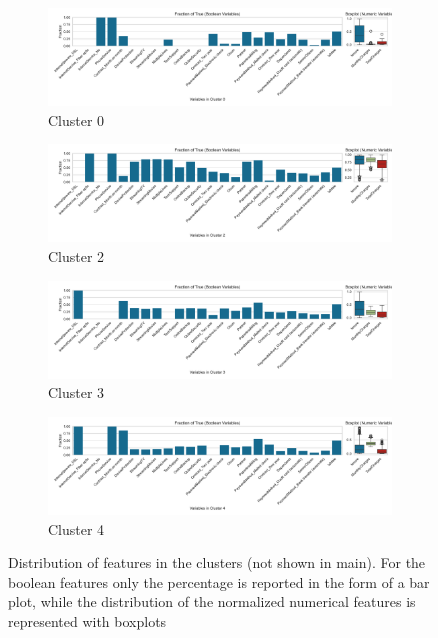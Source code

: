 \documentclass[a4paper,11pt]{article}
\begin{document}
\begin{figure}
    \centering
    \begin{subfigure}{\linewidth}
        \includegraphics[width=\linewidth]{figures/clustering/cluster_0_clusters.pdf}
    \caption{Cluster 0}
    \label{fig:cluster_0}
    \end{subfigure}
    \begin{subfigure}{\linewidth}
        \includegraphics[width=\linewidth]{figures/clustering/cluster_2_clusters.pdf}
    \caption{Cluster 2}
    \label{fig:cluster_2}
    \end{subfigure}
    \begin{subfigure}{\linewidth}
        \includegraphics[width=\linewidth]{figures/clustering/cluster_3_clusters.pdf}
    \caption{Cluster 3}
    \label{fig:cluster_3}
    \end{subfigure}
    \begin{subfigure}{\linewidth}
        \includegraphics[width=\linewidth]{figures/clustering/cluster_4_clusters.pdf}
    \caption{Cluster 4}
    \label{fig:cluster_4}
    \end{subfigure}
    \caption{Distribution of features in the clusters (not shown in main). For the boolean features only the percentage is reported in the form of a bar plot, while the distribution of the normalized numerical features is represented with boxplots}
\end{figure}
\end{document}

